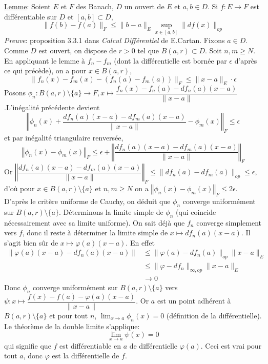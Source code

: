 \documentclass{fancybook}
\begin{document}
\underline{Lemme}: Soient $E$ et $F$ des Banach, $D$ un ouvert de $E$ et $a,b\in D$. Si $f:E\to F$ est différentiable sur $D$ et $[a,b]\subset D$, $$\|f(b)-f(a)\|_F\leq \|b-a\|_E \sup_{x\in [a,b]}\|df(x)\|_{op}$$
\textit{Preuve}: proposition 3.3.1 dans \textit{Calcul Différentiel} de E.Cartan.\newline \newline 
Fixons $a\in D$. Comme $D$ est ouvert, on dispose de $r>0$ tel que $B(a,r)\subset D$. Soit $n,m\geq N$. En appliquant le lemme à $f_n-f_m$ (dont la différentielle est bornée par $\epsilon$ d'après ce qui précède), on a pour $x\in B(a,r)$, $$\|f_n(x)-f_m(x)-(f_n(a)-f_m(a))\|_F\leq \|x-a\|_E \cdot\epsilon$$
Posons $\displaystyle \phi_n: B(a,r)\setminus \{a\}\to F, x\mapsto \dfrac{f_n(x)-f_n(a)-df_n(a)(x-a)}{\|x-a\|}$.\newline  L'inégalité précédente devient $$\left \Vert \phi_n(x) + \dfrac{df_n(a)(x-a)-df_m(a)(x-a)}{\|x-a\|} - \phi_m(x)\right \Vert_F\leq \epsilon $$ et par inégalité triangulaire renversée, $$\left \Vert \phi_n(x) - \phi_m(x)\right \Vert_F\leq \epsilon + \left \Vert \dfrac{df_n(a)(x-a)-df_m(a)(x-a)}{\|x-a\|}\right \Vert_F $$
Or $\displaystyle \left \Vert \dfrac{df_n(a)(x-a)-df_m(a)(x-a)}{\|x-a\|}\right \Vert_F \leq  \|df_n(a)-df_m(a)\|_{op}\leq \epsilon $,\newline
 d'où pour $x\in B(a,r)\setminus \{a\}$ et $n,m\geq N$ on a $\displaystyle \left \Vert \phi_n(x) - \phi_m(x)\right \Vert_F\leq 2\epsilon$.
D'après le critère uniforme de Cauchy, on déduit que $\phi_n$ converge uniformément sur $B(a,r)\setminus \{a\}$.\newline
Déterminons la limite simple de $\phi_n$ (qui coincide nécessairement avec sa limite uniforme). On sait déjà que $f_n$ converge simplement vers $f$, donc il reste à déterminer la limite simple de $x\mapsto df_n(a)(x-a)$. Il s'agit bien sûr de $x\mapsto \varphi(a)(x-a)$. En effet $$\begin{aligned}\|\varphi(a)(x-a)-df_n(a)(x-a)\| &\leq \|\varphi(a)-df_n(a)\|_{op}\|x-a\|_E\\ &\leq \|\varphi -df_n\|_{\infty, op}\|x-a\|_E\\ &\to 0 \end{aligned}$$
Donc $\phi_n$ converge uniformément sur $B(a,r)\setminus \{a\}$ vers $\psi: x\mapsto \dfrac{f(x)-f(a)-\varphi(a)(x-a)}{\|x-a\|}$.\newline
Or $a$ est un point adhérent à $B(a,r)\setminus \{a\}$ et pour tout $n$, $\displaystyle \lim_{x\to a}\phi_n(x) = 0$ (définition de la différentielle).
Le théorème de la double limite s'applique: $$\lim_{x\to a} \psi(x) = 0$$
qui signifie que $f$ est différentiable en $a$ de différentielle $\varphi(a)$. Ceci est vrai pour tout $a$, donc $\varphi$ est la différentielle de $f$.
\end{document}
